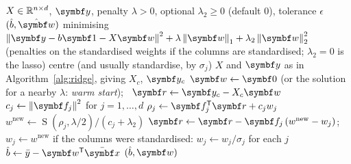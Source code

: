 \documentclass[11pt]{article}
\newcommand{\w}{\vect{w}}
\newcommand{\y}{\vect{y}}
\newcommand{\soft}{\operatorname{S}}
\newcommand{\vr}{\vect{r}}
\begin{document}
\begin{algorithm}[!tbp]
\caption{Lasso (and elastic net) by cyclic coordinate descent}
\label{alg:cd}
\begin{algorithmic}[1]
\Require $X \in \mathbb{R}^{n \times d}$, $\y$, penalty $\lambda > 0$, optional $\lambda_2 \ge 0$ (default $0$), tolerance $\epsilon$
\Ensure $(\hat b, \hat{\w})$ minimising $\norm{\y - b\vect{1} - X\w}^2 + \lambda\norm{\w}_1 + \lambda_2\norm{\w}_2^2$
(penalties on the standardised weights if the columns are standardised; $\lambda_2 = 0$ is the lasso)
\State centre (and usually standardise, by $\sigma_j$) $X$ and $\y$ as in Algorithm~\ref{alg:ridge}, giving $X_c$, $\y_c$
\State $\w \gets \vect{0}$ (or the solution for a nearby $\lambda$: \emph{warm start}); \ $\vr \gets \y_c - X_c\w$
\State $c_j \gets \norm{\vect{f}_j}^2$ for $j = 1, \dots, d$ 
\Repeat
    \State $\rho_j \gets \vect{f}_j\T\vr + c_j w_j$ 
    \State $w^{\text{new}} \gets \soft(\rho_j, \lambda/2)/(c_j + \lambda_2)$ 
    \State $\vr \gets \vr - \vect{f}_j\,(w^{\text{new}} - w_j)$; \ $w_j \gets w^{\text{new}}$ 
  \EndFor
{}
\State if the columns were standardised: $w_j \gets w_j/\sigma_j$ for each $j$ 
\State $\hat b \gets \bar y - \w\T\bar{\x}$
\State \Return $(\hat b, \w)$
\end{algorithmic}
\end{algorithm}
\end{document}
